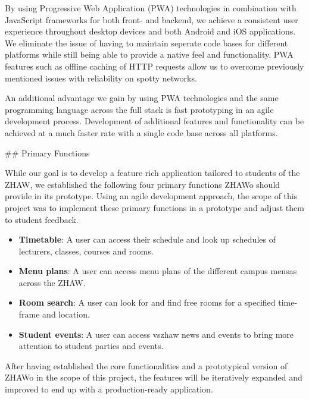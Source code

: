 \begin{markdown}
By using Progressive Web Application (PWA) technologies \cite{DUMMY} in combination with JavaScript frameworks for both front- and backend, we achieve a consistent user experience throughout desktop devices and both Android and iOS applications. We eliminate the issue of having to maintain seperate code bases for different platforms while still being able to provide a native feel and functionality. PWA features such as offline caching of HTTP requests allow us to overcome previously mentioned issues with reliability on spotty networks.

An additional advantage we gain by using PWA technologies and the same programming language across the full stack is fast prototyping in an agile development process. Development of additional features and functionality can be achieved at a much faster rate with a single code base across all platforms.

\newpage

## Primary Functions

While our goal is to develop a feature rich application tailored to students of the ZHAW, we established the following four primary functions ZHAWo should provide in its prototype. Using an agile development approach, the scope of this project was to implement these primary functions in a prototype and adjust them to student feedback.

\begin{itemize}
  \item \textbf{Timetable}: A user can access their schedule and look up schedules of lecturers, classes, courses and rooms.
  \item \textbf{Menu plans}: A user can access menu plans of the different campus mensas across the ZHAW.
  \item \textbf{Room search}: A user can look for and find free rooms for a specified time-frame and location.
  \item \textbf{Student events}: A user can access vszhaw news and events to bring more attention to student parties and events.
\end{itemize}

After having established the core functionalities and a prototypical version of ZHAWo in the scope of this project, the features will be iteratively expanded and improved to end up with a production-ready application.

\end{markdown}
